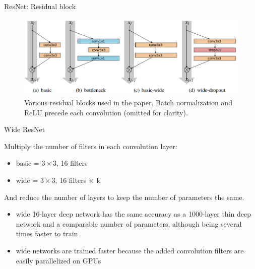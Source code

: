 \documentclass{beamer}
\begin{document}
\begin{frame}{ResNet: Residual block}
\begin{figure}[h]
\includegraphics[width=\textwidth]{img/resnet_blocks}
\caption{Various residual blocks used in the paper. Batch normalization and ReLU precede
each convolution (omitted for clarity). \cite{cit:resnet}}
\end{figure}
\end{frame}
\begin{frame}{Wide ResNet}

Multiply the number of filters in each convolution layer:
\begin{itemize}
\item basic = $3 \times 3$, 16 filters
\item wide = $3 \times 3$, 16 filters $\times$ k
\end{itemize}
And reduce the number of layers to keep the number of parameters the same.

\begin{itemize}
\item wide 16-layer deep network has the same accuracy as a 1000-layer thin deep network and a comparable
number of parameters, although being several times faster to train
\item wide networks are trained faster because the added convolution filters are easily parallelized on GPUs
\end{itemize}



\end{frame}
\end{document}
